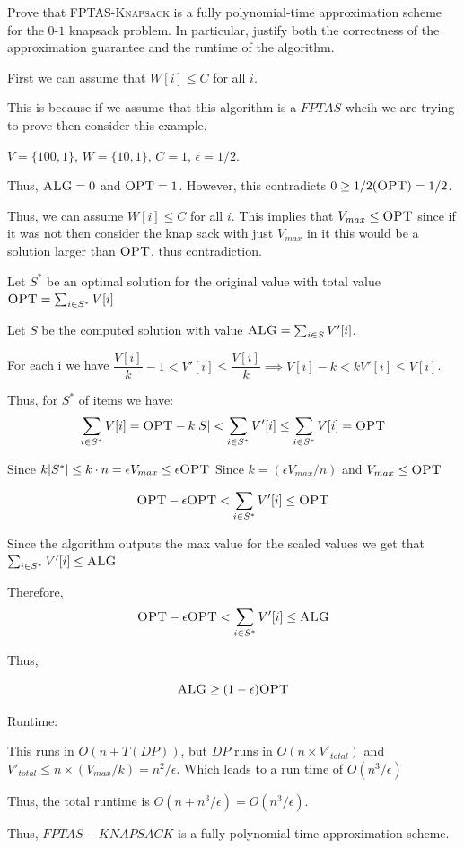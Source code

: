 \documentclass[12pt, letterpaper]{article}
\begin{document}
\begin{subproblem}{}
    Prove that \textsc{FPTAS-Knapsack} is a fully polynomial-time approximation scheme for the $0$-$1$ knapsack problem. In particular, justify both the correctness of the approximation guarantee and the runtime of the algorithm.
\end{subproblem}
\begin{problemproof}
    First we can assume that $W[i] \leq C$ for all $i$.

    This is because if we assume that this algorithm is a $FPTAS$ whcih we are trying to prove then consider this example.

    $V=\{100,1\}$, $W=\{10,1\}$, $C=1$, $\epsilon=1/2$.

    Thus, $\textsc{ALG}=0$ and $\textsc{OPT}=1$. However, this contradicts $0 \geq 1/2(\textsc{OPT})=1/2$.

    Thus, we can assume $W[i] \leq C$ for all $i$. This implies that $V_{max} \leq \textsc{OPT}$ since if it was not then consider the knap sack with just $V_{max}$ in it this would be a solution larger than $\textsc{OPT}$, thus contradiction.

    Let $S^*$ be an optimal solution for the original value with total value $\textsc{OPT} = \sum_{i \in S^*}V[i]$

    Let $S$ be the computed solution with value $\textsc{ALG} = \sum_{i \in S} V'[i]$.

    For each i we have $\dfrac{V[i]}{k}-1 < V'[i] \leq \dfrac{V[i]}{k} \implies V[i]-k < kV'[i] \leq V[i]$.

    Thus, for  $S^*$ of items we have:
    \[\sum_{i \in S^*} V[i]=\textsc{OPT} - k|S| < \sum_{i \in S^*} V'[i] \leq \sum_{i \in S^*} V[i]=\textsc{OPT}\]

    Since $k|S^*| \leq k \cdot n = \epsilon V_{max} \leq \epsilon \textsc{OPT}$ Since $k=(\epsilon V_{max}/n)$ and $V_{max} \leq \textsc{OPT}$

    \[\textsc{OPT} - \epsilon \textsc{OPT} < \sum_{i \in S^*} V'[i] \leq \textsc{OPT}\]

    Since the algorithm outputs the max value for the scaled values we get that $\sum_{i \in S^*} V'[i] \leq \textsc{ALG}$

    Therefore,
    \[\textsc{OPT} - \epsilon \textsc{OPT} < \sum_{i \in S^*} V'[i] \leq \textsc{ALG}\]

    Thus,

    \[\textsc{ALG} \geq (1-\epsilon)\textsc{OPT}\]

    Runtime:

    This runs in $O(n+T(DP))$, but $DP$ runs in $O(n \times V'_{total})$ and $V'_{total} \leq n \times (V_{max}/k)=n^2/ \epsilon$. Which leads to a run time of $O(n^3/\epsilon)$

    Thus, the total runtime is $O(n+ n^3/\epsilon)=O(n^3/\epsilon)$.

    Thus, $FPTAS-KNAPSACK$ is a fully polynomial-time approximation scheme.
\end{problemproof}
\end{document}
